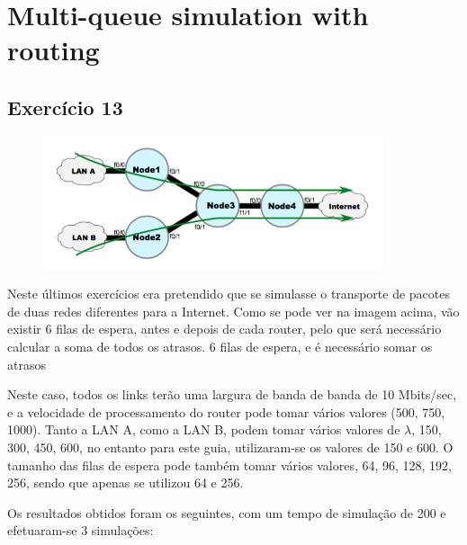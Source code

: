 \documentclass[pdftex,12pt,a4paper]{report}
\begin{document}
\newpage
\section{Multi-queue simulation with routing}

\subsection{Exercício 13}
\begin{figure}[!htb]
\center
 \includegraphics[width=100mm,scale=1]{imagensGuia/ex13.png}
 \label{fig:ex13}
\end{figure}

Neste últimos exercícios era pretendido que se simulasse o transporte de pacotes de duas redes diferentes para a Internet. Como se pode ver na imagem acima, vão existir 6 filas de espera, antes e depois de cada router, pelo que será necessário calcular a soma de todos os atrasos.
6 filas de espera, e é necessário somar os atrasos

Neste caso, todos os links terão uma largura de banda de banda de 10 Mbits/sec, e a velocidade de processamento do router pode tomar vários valores (500, 750, 1000). Tanto a LAN A, como a LAN B, podem tomar vários valores de $\lambda$, 150, 300, 450, 600, no entanto para este guia, utilizaram-se os valores de 150 e 600. O tamanho das filas de espera pode também tomar vários valores, 64, 96, 128, 192, 256, sendo que apenas se utilizou 64 e 256.

Os resultados obtidos foram os seguintes, com um tempo de simulação de 200 e efetuaram-se 3 simulações:
\end{document}
